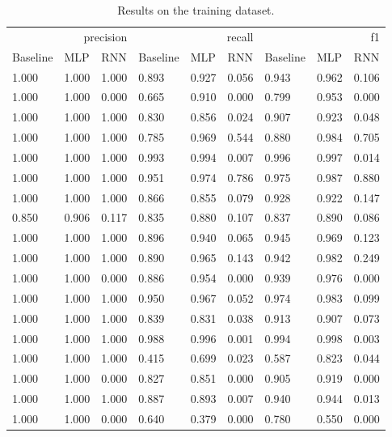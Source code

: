 \begin{table}
\caption{Results on the training dataset.}
\label{tab::ex_2_train}
\begin{tabular}{|l||l||l||l||l||l||l||l||l|}
\toprule
\multicolumn{3}{r}{precision} & \multicolumn{3}{r}{recall} & \multicolumn{3}{r}{f1} \\
Baseline & MLP & RNN & Baseline & MLP & RNN & Baseline & MLP & RNN \\
\midrule
1.000 & 1.000 & 1.000 & 0.893 & 0.927 & 0.056 & 0.943 & 0.962 & 0.106 \\
1.000 & 1.000 & 0.000 & 0.665 & 0.910 & 0.000 & 0.799 & 0.953 & 0.000 \\
1.000 & 1.000 & 1.000 & 0.830 & 0.856 & 0.024 & 0.907 & 0.923 & 0.048 \\
1.000 & 1.000 & 1.000 & 0.785 & 0.969 & 0.544 & 0.880 & 0.984 & 0.705 \\
1.000 & 1.000 & 1.000 & 0.993 & 0.994 & 0.007 & 0.996 & 0.997 & 0.014 \\
1.000 & 1.000 & 1.000 & 0.951 & 0.974 & 0.786 & 0.975 & 0.987 & 0.880 \\
1.000 & 1.000 & 1.000 & 0.866 & 0.855 & 0.079 & 0.928 & 0.922 & 0.147 \\
0.850 & 0.906 & 0.117 & 0.835 & 0.880 & 0.107 & 0.837 & 0.890 & 0.086 \\
1.000 & 1.000 & 1.000 & 0.896 & 0.940 & 0.065 & 0.945 & 0.969 & 0.123 \\
1.000 & 1.000 & 1.000 & 0.890 & 0.965 & 0.143 & 0.942 & 0.982 & 0.249 \\
1.000 & 1.000 & 0.000 & 0.886 & 0.954 & 0.000 & 0.939 & 0.976 & 0.000 \\
1.000 & 1.000 & 1.000 & 0.950 & 0.967 & 0.052 & 0.974 & 0.983 & 0.099 \\
1.000 & 1.000 & 1.000 & 0.839 & 0.831 & 0.038 & 0.913 & 0.907 & 0.073 \\
1.000 & 1.000 & 1.000 & 0.988 & 0.996 & 0.001 & 0.994 & 0.998 & 0.003 \\
1.000 & 1.000 & 1.000 & 0.415 & 0.699 & 0.023 & 0.587 & 0.823 & 0.044 \\
1.000 & 1.000 & 0.000 & 0.827 & 0.851 & 0.000 & 0.905 & 0.919 & 0.000 \\
1.000 & 1.000 & 1.000 & 0.887 & 0.893 & 0.007 & 0.940 & 0.944 & 0.013 \\
1.000 & 1.000 & 0.000 & 0.640 & 0.379 & 0.000 & 0.780 & 0.550 & 0.000 \\
\bottomrule
\end{tabular}
\end{table}

